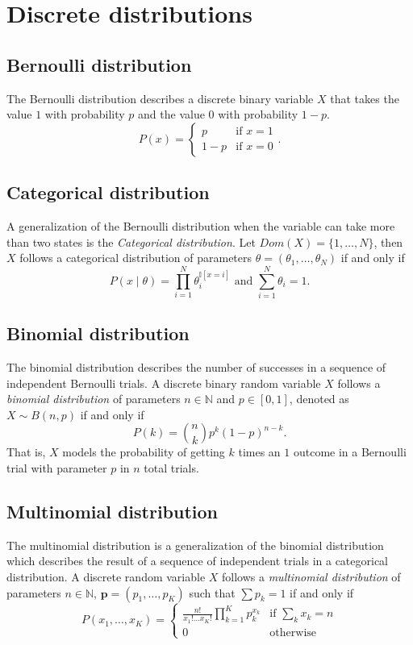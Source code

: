 \section{Discrete distributions}

\subsection*{Bernoulli distribution}

The Bernoulli distribution describes a discrete binary variable \(X\) that takes
the value \(1\)  with probability \(p\) and the value \(0\)  with probability \(1-p\).
\[
  P(x) =
\left\{
  \begin{array}{ll}
    p  & \mbox{if } x = 1 \\
    1-p & \mbox{if } x = 0
  \end{array}.
\right.
\]

\subsection*{Categorical distribution}

A generalization of the Bernoulli distribution when the variable can take more than two states is the \emph{Categorical distribution}. Let \(Dom(X) = \{1,\dots,N\}\), then \(X\) follows a categorical distribution of parameters \(\theta = (\theta_{1},\dots, \theta_{N})\) if and only if
\[
  P(x \mid \theta) = \prod_{i=1}^{N}\theta_{i}^{\mathbb{I}[x = i]} \text{ and } \sum_{i = 1}^{N}\theta_{i} = 1.
\]

\subsection*{Binomial distribution}

The binomial distribution describes the number of successes in a sequence of
independent Bernoulli trials. A discrete binary random variable \(X\) follows a
\emph{binomial distribution} of parameters \(n \in \mathbb{N}\) and \(p \in
[0,1]\), denoted as \(X \sim B(n, p)\) if and only if
\[
  P(k) = \binom{n}{k}p^k{(1-p)}^{n-k}.
\]
That is, \(X\) models the probability of getting \(k\) times an \(1\) outcome in a Bernoulli trial with parameter \(p\) in \(n\) total trials.


\subsection*{Multinomial distribution}
The multinomial distribution is a generalization of the binomial distribution which describes the result of a sequence of independent trials in a categorical distribution. A discrete random variable \(X\) follows a \emph{multinomial distribution} of parameters \(n \in \mathbb{N}\), \(\bm{p} = (p_{1},\dots,p_{K})\) such that \(\sum p_{k} = 1\)  if and only if
\[
  P(x_{1},\dots,x_{K}) =
  \begin{cases}
    \frac{n!}{x_{1}!\dots x_{K}!}\prod_{k=1}^{K}p_{k}^{x_{k}} & \text{if } \sum_{k}{x_{k}} = n\\
    0 & \text{otherwise}
  \end{cases}
\]

